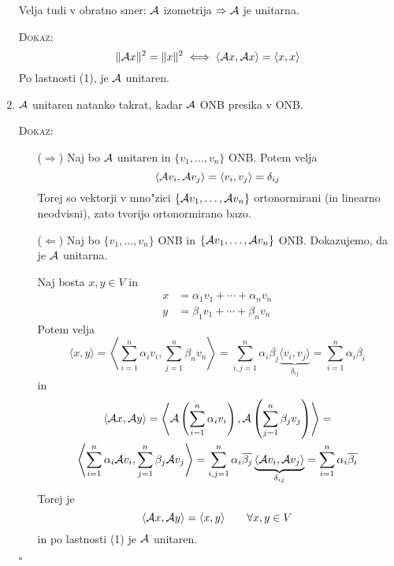 \begin{enumerate}
    Velja tudi v obratno smer: $\mathcal{A}$ izometrija $\Rightarrow \mathcal{A}$ je unitarna.
    
    \textsc{Dokaz:}
    \begin{equation*}
    \| \mathcal{A} x \|^2 = \| x \|^2 \iff \langle \mathcal{A} x, \mathcal{A} x \rangle = \langle x, x \rangle
    \end{equation*}
    Po lastnosti (1), je $\mathcal{A}$ unitaren.
    
    \item $\mathcal{A}$ unitaren natanko takrat, kadar $\mathcal{A}$ ONB presika v ONB.
    
    \textsc{Dokaz:}
    \begin{itemize}
        \item[($\Rightarrow$)] Naj bo $\mathcal{A}$ unitaren in $\{v_1, \ldots, v_n \}$ ONB. Potem velja
        \begin{equation*}
        \langle \mathcal{A} v_i, \mathcal{A} v_j \rangle = \langle v_i, v_j \rangle = \delta_{ij}
        \end{equation*}
        Torej so vektorji v mno"zici $\{ \mathcal{A} v_1, \ldots, \mathcal{A} v_n \}$ ortonormirani (in linearno neodvisni), zato tvorijo ortonormirano bazo.
        
        \item[($\Leftarrow$)] Naj bo $\{ v_1, \ldots, v_n \}$ ONB in $\{ \mathcal{A} v_1, \ldots, \mathcal{A} v_n \}$ ONB. Dokazujemo, da je $\mathcal{A}$ unitarna.
        
        Naj bosta $x, y \in V$ in 
        \begin{align*}
        x &= \alpha_1 v_1 + \cdots + \alpha_n v_n \\
        y &= \beta_1 v_1 + \cdots + \beta_n v_n
        \end{align*}
        Potem velja
        \begin{equation*}
        \langle x, y \rangle = \left\langle \sum_{i=1}^n \alpha_i v_i, \sum_{j=1}^n \beta_n v_n \right\rangle = \sum_{i, j = 1}^n \alpha_i \overline{\beta_j} \underbrace{\langle v_i, v_j \rangle}_{\delta_{ij}} = \sum_{i = 1}^n \alpha_i \overline{\beta_i} 
        \end{equation*}
        in
        \begin{multline*}
        \langle \mathcal{A} x, \mathcal{A} y \rangle = \left\langle \mathcal{A} \left( \sum_{i=1}^n \alpha_i v_i \right), \mathcal{A} \left( \sum_{j=1}^n \beta_j v_j \right) \right\rangle = \\
        \left\langle \sum_{i=1}^n \alpha_i \mathcal{A} v_i, \sum_{j=1}^n \beta_j \mathcal{A} v_j \right\rangle = \sum_{i, j = 1}^n \alpha_i \overline{\beta_j} \underbrace{\langle \mathcal{A} v_i, \mathcal{A} v_j \rangle}_{\delta_{ij}} = \sum_{i=1}^n \alpha_i \overline{\beta_i}
        \end{multline*}
        Torej je
        \begin{equation*}
        \langle \mathcal{A} x, \mathcal{A} y \rangle = \langle x, y \rangle \qquad \forall x, y \in V
        \end{equation*}
        in po lastnosti (1) je $\mathcal{A}$ unitaren.
    \end{itemize}
    \hfill $\square$


\end{enumerate}
